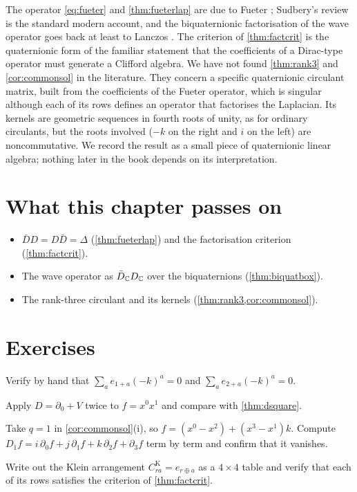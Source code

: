\begin{litbox}
The operator \eqref{eq:fueter} and \cref{thm:fueterlap} are due to Fueter \cite{Fueter1934}; Sudbery's review \cite{Sudbery1979} is the standard modern account, and the biquaternionic factorisation of the wave operator goes back at least to Lanczos \cite{Lanczos1929}. The criterion of \cref{thm:factcrit} is the quaternionic form of the familiar statement that the coefficients of a Dirac-type operator must generate a Clifford algebra. We have not found \cref{thm:rank3} and \cref{cor:commonsol} in the literature. They concern a specific quaternionic circulant matrix, built from the coefficients of the Fueter operator, which is singular although each of its rows defines an operator that factorises the Laplacian. Its kernels are geometric sequences in fourth roots of unity, as for ordinary circulants, but the roots involved ($-k$ on the right and $i$ on the left) are noncommutative. We record the result as a small piece of quaternionic linear algebra; nothing later in the book depends on its interpretation.
\end{litbox}

\section*{What this chapter passes on}
\begin{itemize}[nosep]
\item $\bar DD=D\bar D=\Delta$ (\cref{thm:fueterlap}) and the factorisation criterion (\cref{thm:factcrit}).
\item The wave operator as $\bar D_{\mathbb{C}}D_{\mathbb{C}}$ over the biquaternions (\cref{thm:biquatbox}).
\item The rank-three circulant and its kernels (\cref{thm:rank3,cor:commonsol}).
\end{itemize}

\section*{Exercises}
\begin{exercise}
Verify by hand that $\sum_ae_{1+a}(-k)^a=0$ and $\sum_ae_{2+a}(-k)^a=0$.
\end{exercise}
\begin{exercise}
Apply $D=\partial_0+V$ twice to $f=x^0x^1$ and compare with \cref{thm:dsquare}.
\end{exercise}
\begin{exercise}
Take $q=1$ in \cref{cor:commonsol}(i), so $f=(x^0-x^2)+(x^3-x^1)k$. Compute $D_1f=i\,\partial_0f+j\,\partial_1f+k\,\partial_2f+\partial_3f$ term by term and confirm that it vanishes.
\end{exercise}
\begin{exercise}
Write out the Klein arrangement $C^{\mathrm K}_{ra}=e_{r\oplus a}$ as a $4\times4$ table and verify that each of its rows satisfies the criterion of \cref{thm:factcrit}.
\end{exercise}

